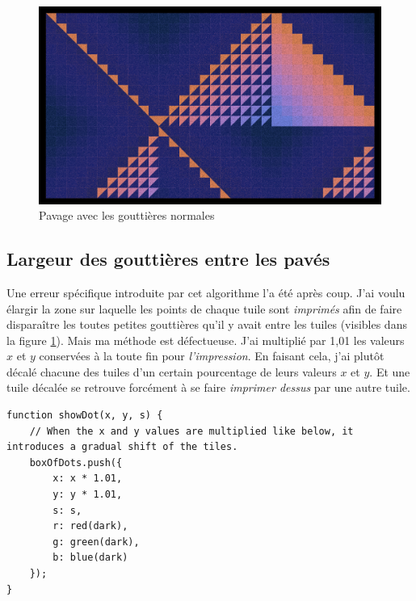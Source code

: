 \begin{figure}[h]
\includegraphics[width=1\textwidth]{images/pavage002.jpg}
\caption{Pavage avec les gouttières normales}
\label{normalgutters}
\end{figure}

\subsection{Largeur des gouttières entre les pavés}
Une erreur spécifique introduite par cet algorithme l'a été après coup. J'ai voulu élargir la zone sur laquelle les points de chaque tuile sont \textit{imprimés} afin de faire disparaître les toutes petites gouttières qu'il y avait entre les tuiles (visibles dans la figure \ref{normalgutters}). Mais ma méthode est défectueuse. J'ai multiplié par 1,01 les valeurs $x$ et $y$ conservées à la toute fin pour \textit{l'impression}. En faisant cela, j'ai plutôt décalé chacune des tuiles d'un certain pourcentage de leurs valeurs $x$ et $y$. Et une tuile décalée se retrouve forcément à se faire \textit{imprimer dessus} par une autre tuile.

\begin{lstlisting}
function showDot(x, y, s) {
    // When the x and y values are multiplied like below, it introduces a gradual shift of the tiles.
    boxOfDots.push({
        x: x * 1.01,
        y: y * 1.01,
        s: s,
        r: red(dark),
        g: green(dark),
        b: blue(dark)
    });
}
\end{lstlisting}

